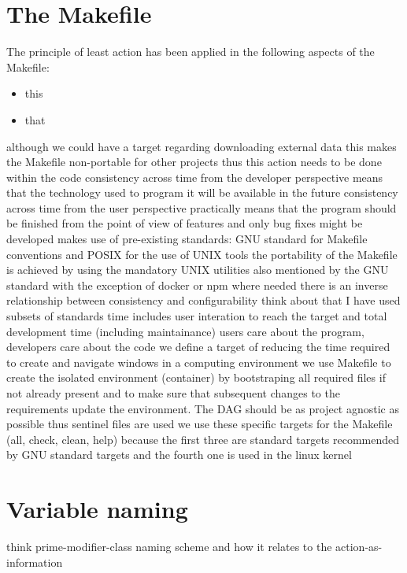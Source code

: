 \documentclass[journal]{IEEEtran}
\begin{document}
\section{The Makefile}
The principle of least action has been applied in the following aspects of the Makefile:
\begin{itemize}
	\item this
	\item that
\end{itemize}

although we could have a target regarding downloading external data this makes the Makefile non-portable for other projects thus this action needs to be done within the code
consistency across time from the developer perspective means that the technology used to program it will be available in the future
consistency across time from the user perspective practically means that the program should be finished from the point of view of features and only bug fixes might be developed
makes use of pre-existing standards: GNU standard for Makefile conventions and POSIX for the use of UNIX tools
the portability of the Makefile is achieved by using the mandatory UNIX utilities also mentioned by the GNU standard with the exception of docker or npm where needed
there is an inverse relationship between consistency and configurability
think about that I have used subsets of standards
time includes user interation to reach the target and total development time (including maintainance)
users care about the program, developers care about the code
we define a target of reducing the time required to create and navigate windows in a computing environment
we use Makefile to create the isolated environment (container) by bootstraping all required files if not already present and to make sure that subsequent changes to the requirements update the environment. The DAG should be as project agnostic as possible thus sentinel files are used
we use these specific targets for the Makefile (all, check, clean, help) because the first three are standard targets recommended by GNU standard targets and the fourth one is used in the linux kernel

\section{Variable naming}
think prime-modifier-class naming scheme and how it relates to the action-as-information
\end{document}
